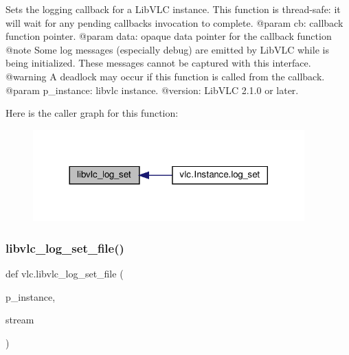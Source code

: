 \begin{DoxyVerb}Sets the logging callback for a LibVLC instance.
This function is thread-safe: it will wait for any pending callbacks
invocation to complete.
@param cb: callback function pointer.
@param data: opaque data pointer for the callback function @note Some log messages (especially debug) are emitted by LibVLC while is being initialized. These messages cannot be captured with this interface. @warning A deadlock may occur if this function is called from the callback.
@param p_instance: libvlc instance.
@version: LibVLC 2.1.0 or later.
\end{DoxyVerb}
 Here is the caller graph for this function\+:
\nopagebreak
\begin{figure}[H]
\begin{center}
\leavevmode
\includegraphics[width=296pt]{namespacevlc_aff40c0e783a0949925936432b4beba34_icgraph}
\end{center}
\end{figure}
\mbox{\label{namespacevlc_aa18225aa223a1abfd7245a682fd599a0}} 
\subsubsection{\texorpdfstring{libvlc\+\_\+log\+\_\+set\+\_\+file()}{libvlc\_log\_set\_file()}}
{\footnotesize\ttfamily def vlc.\+libvlc\+\_\+log\+\_\+set\+\_\+file (\begin{DoxyParamCaption}\item[{}]{p\+\_\+instance,  }\item[{}]{stream }\end{DoxyParamCaption})}

